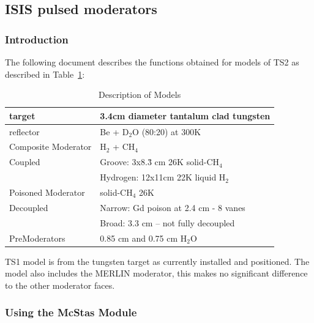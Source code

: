 \subsection*{ISIS pulsed moderators}
\label{isis-moderator}


\subsubsection{Introduction}

The following document describes the functions obtained for models of
TS2 as described in Table~\ref{desc}:

\begin{table}[h]
\begin{center}
\begin{tabular}{|l|l|}
\hline
target & 3.4cm diameter tantalum clad tungsten \\
\hline
reflector & Be + D$_2$O (80:20) at 300K \\
\hline
Composite Moderator & H$_2$ + CH$_4$ \\
Coupled         & Groove: 3x8.\.{3} cm 26K solid-CH$_4$ \\
                & Hydrogen: 12x11cm 22K liquid H$_2$ \\
\hline
Poisoned Moderator &  solid-CH$_4$ 26K  \\
Decoupled           & Narrow: Gd poison at 2.4 cm - 8 vanes\\
                    &  Broad: 3.3 cm -- not fully decoupled \\
\hline
PreModerators & 0.85 cm and 0.75 cm H$_2$O \\
\hline
\end{tabular}
\caption{Description of Models}
\label{desc}
\end{center}
\end{table}

TS1 model is from the tungsten target as currently installed and
positioned. The model also includes the MERLIN moderator, this
makes no significant difference to the other moderator faces.




\subsubsection{Using the McStas Module}

